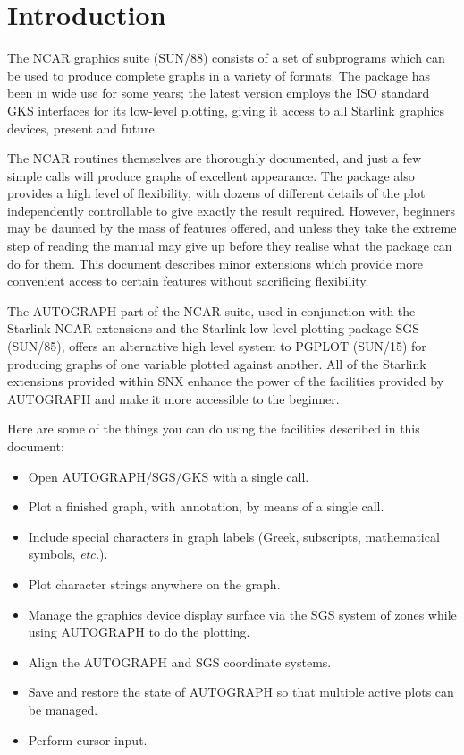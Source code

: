 \newpage
\section {Introduction}

The NCAR graphics suite (SUN/88) consists of a set of subprograms which
can be used to produce complete graphs in a variety of formats.  The
package has been in wide use for some years; the latest version employs
the ISO standard GKS interfaces for its low-level plotting, giving it
access to all Starlink graphics devices, present and future.

The NCAR routines themselves are thoroughly documented, and just a few
simple calls will produce graphs of excellent appearance.  The package
also provides a high level of flexibility, with dozens of different
details of the plot independently controllable to give exactly the
result required.  However, beginners may be daunted by the mass of
features offered, and unless they take the extreme step of reading the
manual may give up before they realise what the package can do for
them.  This document describes minor extensions which provide more
convenient access to certain features without sacrificing flexibility.

The AUTOGRAPH part of the NCAR suite, used in conjunction with the
Starlink NCAR extensions and the Starlink low level plotting package
SGS (SUN/85), offers an alternative high level system to PGPLOT
(SUN/15) for producing graphs of one variable plotted against another.
All of the Starlink extensions provided within SNX enhance the power of
the facilities provided by AUTOGRAPH and make it more accessible to the
beginner.

Here are some of the things you can do using the facilities described
in this document:

\begin{itemize}

\item Open AUTOGRAPH/SGS/GKS with a single call.

\item Plot a finished graph, with annotation, by means of a single call.

\item Include special characters in graph labels (Greek, subscripts,
mathematical symbols, {\em etc.}).

\item Plot character strings anywhere on the graph.

\item Manage the graphics device display surface via the SGS system of
zones while using AUTOGRAPH to do the plotting.

\item Align the AUTOGRAPH and SGS coordinate systems.

\item Save and restore the state of AUTOGRAPH so that multiple active
plots can be managed.

\item Perform cursor input.

\end{itemize}

